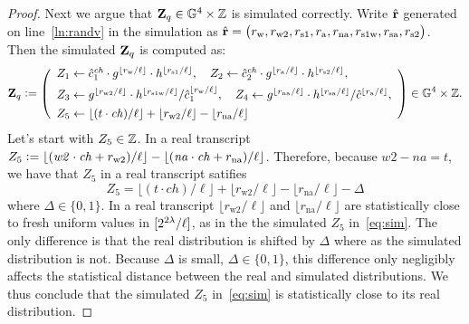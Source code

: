 \documentclass[11pt]{article}
\begin{document}
\begin{proof}
Next we argue that $\mathbf{Z}_q \in \mathbb G^4 \times \mathbb Z$ is simulated correctly. 
Write $\hat{\mathbf{r}}$ generated on line~\eqref{ln:randv} in the simulation
as $\hat{\mathbf{r}} = \big(r_\text{w}, r_\text{w2}, r_\text{s1}, r_\text{a}, r_\text{na}, r_\text{s1w}, r_\text{sa}, r_\text{s2} \big)$.
Then the simulated $\mathbf{Z}_q$ is computed as:
\begin{equation} \label{eq:sim}
\Zv_q \deq \left(\begin{array}{l}
Z_1 \gets \hat{c}_1^\mathit{ch} \cdot g^{\lfloor r_\text{w}/\ell \rfloor} \cdot h^{\lfloor r_\text{s1}/\ell \rfloor} ,\quad
Z_2 \gets \hat{c}_2^\mathit{ch} \cdot g^{\lfloor r_\text{a}/\ell \rfloor} \cdot h^{\lfloor r_\text{s2}/\ell \rfloor} , \AlgSep
Z_3 \gets g^{\lfloor r_\text{w2}/\ell \rfloor} \cdot h^{\lfloor r_\text{s1w}/\ell \rfloor} / \hat{c}_1^{\lfloor r_\text{w}/\ell \rfloor},\quad
Z_4 \gets g^{\lfloor r_\text{na}/\ell \rfloor} \cdot h^{\lfloor r_\text{sa}/\ell \rfloor} / \hat{c}^{\lfloor r_\text{a}/\ell \rfloor}, \AlgSep
Z_5 \gets \lfloor (t \cdot \mathit{ch})/\ell \rfloor + \lfloor r_\text{w2}/\ell \rfloor - \lfloor r_\text{na}/\ell \rfloor 
\end{array}\right) \in \GG^4 \times \ZZ.  
\end{equation}
Let's start with $Z_5 \in \mathbb Z$.  
In a real transcript 
$Z_5 \mathrel{\mathop:}= \lfloor (\mathit{w2} \cdot \mathit{ch} + r_\text{w2})/\ell \rfloor -
          \lfloor (\mathit{na} \cdot \mathit{ch} + r_\text{na})/\ell \rfloor$.
Therefore, because $\mathit{w2} - \mathit{na} = t$, we have
that $Z_5$ in a real transcript satifies
\[    Z_5 = \lfloor (t \cdot \mathit{ch})/\ell \rfloor + \lfloor r_\text{w2} / \ell \rfloor - \lfloor r_\text{na} / \ell \rfloor - \Delta \]
where $\Delta \in \{0, 1\}$. 
In a real transcript $\lfloor r_\text{w2} / \ell \rfloor$ 
and $\lfloor r_\text{na} / \ell \rfloor$ 
are statistically close to fresh uniform values in $[{2^{2\lambda}/\ell}]$, 
as in the the simulated $Z_5$ in~\eqref{eq:sim}.
The only difference is that the real distribution is shifted by $\Delta$
where as the simulated distribution is not.  
Because $\Delta$ is small, $\Delta \in \{0,1\}$,
this difference only negligibly affects the statistical distance
between the real and simulated distributions. 
We thus conclude that the simulated $Z_5$ in~\eqref{eq:sim} 
is statistically close to its real distribution.


\end{proof}
\end{document}

